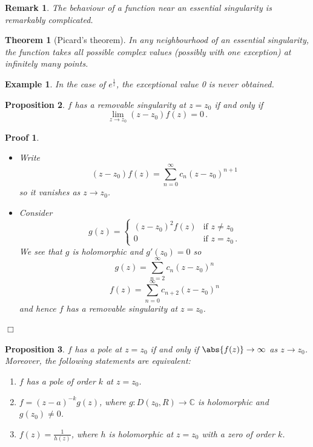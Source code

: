 \documentclass{article}
\theoremstyle{plain}\theoremheaderfont{\normalfont\itshape}\theorembodyfont{\rmfamily}\theoremseparator{.}\newtheorem*{rem}{Remark}\newtheorem*{ex}{Example}\newtheorem*{proof}{Proof}\newtheorem*{altp}{Alternative proof}
\theoremstyle{plain}\theoremheaderfont{\normalfont\bfseries}\theorembodyfont{\rmfamily}\theoremseparator{.}\newtheorem{thm}{Theorem}[section]\newtheorem{lem}[thm]{Lemma}\newtheorem{prop}[thm]{Proposition}\newtheorem*{cor}{Corollary}\newtheorem{defn}[thm]{Definition}\newtheorem{clm}[thm]{Claim}\newtheorem{clminproof}{Claim}
\theoremstyle{break}\theoremheaderfont{\normalfont\itshape}\theorembodyfont{\rmfamily}\theoremseparator{.\medskip}\newtheorem*{proofskip}{Proof}\newtheorem*{exs}{Examples}\newtheorem*{rems}{Remarks}
\theoremstyle{break}\theoremheaderfont{\normalfont\bfseries}\theorembodyfont{\rmfamily}\theoremseparator{.\medskip}\newtheorem{lemskip}[thm]{Lemma}\newtheorem{defnskip}[thm]{Definition}\newtheorem{propskip}[thm]{Proposition}\newtheorem{thmskip}[thm]{Theorem}
\numberwithin{equation}{section}
\newcommand{\qed}{\hfill\ensuremath{\Box}}
\begin{document}
	\begin{rem}
		The behaviour of a function near an essential singularity is remarkably complicated.
	\end{rem}
	\begin{thm}[Picard's theorem]		
		In any neighbourhood of an essential singularity, the function takes all possible complex values (possibly with one exception) at infinitely many points.
	\end{thm}
	\begin{ex}
		In the case of \(e^{\frac{1}{z}}\), the exceptional value 0 is never obtained.
	\end{ex}
	\begin{prop}
		\(f\) has a removable singularity at \(z=z_0\) if and only if
		\[\lim_{z\to z_0}(z-z_0)f(z)=0\,.\]
	\end{prop}
	\begin{proofskip}
		\begin{itemize}[topsep=0pt]
			\item[(\(\Rightarrow\))] Write
			\[(z-z_0)f(z)=\sum_{n=0}^{\infty}c_n(z-z_0)^{n+1}\]
			so it vanishes as \(z\to z_0\).
			\item[(\(\Leftarrow\))] Consider
			\[g(z)=\begin{cases}
				(z-z_0)^2f(z) & \text{if }z\ne z_0\\
				0 & \text{if }z=z_0\,.
			\end{cases}\]
			We see that \(g\) is holomorphic and \(g'(z_0)=0\) so
			\[g(z)=\sum_{n=2}^{\infty}c_n(z-z_0)^n\]
			\[f(z)=\sum_{n=0}^{\infty}c_{n+2}(z-z_0)^n\]
			and hence \(f\) has a removable singularity at \(z=z_0\).
		\end{itemize}\qed
	\end{proofskip}
	\begin{prop}
		\(f\) has a pole at \(z=z_0\) if and only if \(\abs{f(z)}\to\infty\) as \(z\to z_0\). Moreover, the following statements are equivalent:
		\begin{enumerate}[topsep=0pt]
			\item[(i)] \(f\) has a pole of order \(k\) at \(z=z_0\).
			\item[(ii)] \(f=(z-a)^{-k}g(z)\), where \(g:D(z_0,R)\to\mathbb{C}\) is holomorphic and \(g(z_0)\ne 0\).
			\item[(iii)] \(f(z)=\frac{1}{h(z)}\), where \(h\) is holomorphic at \(z=z_0\) with a zero of order \(k\).
		\end{enumerate}
	\end{prop}
\end{document}
